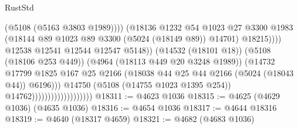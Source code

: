 \begin{lexlean}{RustStd}
\begin{coremodule}
                                                          (@5108 (@5163 @3803 @1989))))
                                                      (@18136
                                                        @1232
                                                        @54
                                                        @1023
                                                        @27
                                                        @3300
                                                        @1983
                                                        (@18144
                                                          @89
                                                          @1023
                                                          @89
                                                          @3300
                                                          (@5024 (@18149 @89))
                                                          @14701)
                                                        @18215))))
                                                @12538
                                                @12541
                                                @12544
                                                @12547
                                                @5148))
                                            (@14532 (@18101 @18))
                                            (@5108 (@18106 @253 @449))
                                            (@4964 (@18113 @449 @20 @3248 @1989))
                                            (@14732
                                              @17799
                                              @1825
                                              @167
                                              @25
                                              @2166
                                              (@18038
                                                @44
                                                @25
                                                @44
                                                @2166
                                                (@5024 (@18043 @44))
                                                @6196)))
                                          @14750
                                          (@5108 (@14755 @1023 @1395 @254))
                                          @14762)))))))))))))))))))
@18311 := @4623 @1036
@18315 := @4625 (@4629 @1036) (@4635 @1036)
@18316 := @4654 @1036
@18317 := @4644 @18316
@18319 := @4640 (@18317 @4659)
@18321 := @4682 (@4683 @1036)

\end{coremodule}
\end{lexlean}
